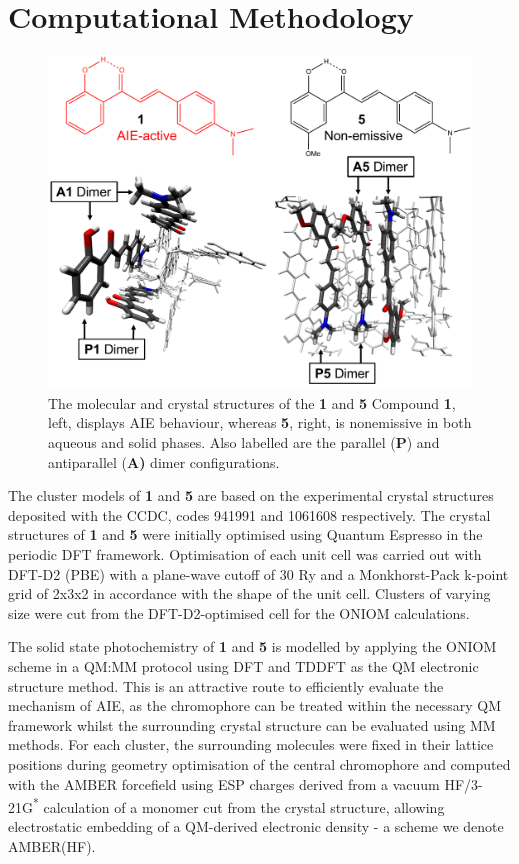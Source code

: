 \section{Computational Methodology}\label{section: Inter_Computional}
\begin{figure}[t]
\centering
  \includegraphics[width=0.9\linewidth]{4IntraInterInteractions/2HC_Schematic.pdf}
  \caption[Molecular, dimer, and crystal structures of \textbf{1} and \textbf{5}]{The molecular and crystal structures of the \textbf{1} and \textbf{5} Compound \textbf{1}, left, displays AIE behaviour, whereas \textbf{5}, right, is nonemissive in both aqueous and solid phases. Also labelled are the parallel (\textbf{P}) and antiparallel (\textbf{A)} dimer configurations.}
  \label{figure: HC_Dimer_Schematic}
\end{figure}
The cluster models of \textbf{1} and \textbf{5} are based on the experimental crystal structures deposited with the CCDC, codes 941991 and 1061608 respectively.\cite{Cheng2015} The crystal structures of \textbf{1} and \textbf{5} were initially optimised using Quantum Espresso in the periodic DFT framework.\cite{QE-2009} Optimisation of each unit cell was carried out with DFT-D2 (PBE) with a plane-wave cutoff of 30 Ry and a Monkhorst-Pack k-point grid of 2x3x2 in accordance with the shape of the unit cell. Clusters of varying size were cut from the DFT-D2-optimised cell for the ONIOM calculations.

The solid state photochemistry of \textbf{1} and \textbf{5} is modelled by applying the ONIOM scheme in a QM:MM protocol using \ac{DFT} and \ac{TDDFT} as the QM electronic structure method.\cite{Byun1999,Frisch2003,Chung2015a} This is an attractive route to efficiently evaluate the mechanism of \ac{AIE}, as the chromophore can be treated within the necessary QM framework whilst the surrounding crystal structure can be evaluated using \ac{MM} methods. For each cluster, the surrounding molecules were fixed in their lattice positions during geometry optimisation of the central chromophore and computed with the AMBER forcefield using ESP charges derived from a vacuum HF/3-21G\textsuperscript{*} calculation of a monomer cut from the crystal structure, allowing electrostatic embedding of a QM-derived electronic density - a scheme we denote AMBER(HF).\cite{Cornell1995}

